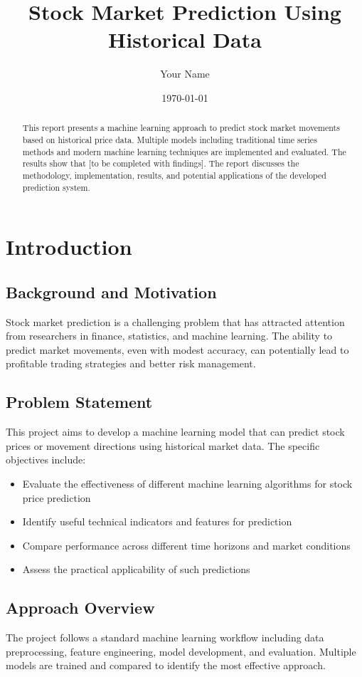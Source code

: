\documentclass[12pt,a4paper]{article}
\title{Stock Market Prediction Using Historical Data}
\author{Your Name}
\date{\today}
\begin{document}
\maketitle

\begin{abstract}
This report presents a machine learning approach to predict stock market movements based on historical price data. Multiple models including traditional time series methods and modern machine learning techniques are implemented and evaluated. The results show that [to be completed with findings]. The report discusses the methodology, implementation, results, and potential applications of the developed prediction system.
\end{abstract}

\tableofcontents
\newpage

\section{Introduction}
\subsection{Background and Motivation}
Stock market prediction is a challenging problem that has attracted attention from researchers in finance, statistics, and machine learning. The ability to predict market movements, even with modest accuracy, can potentially lead to profitable trading strategies and better risk management.

\subsection{Problem Statement}
This project aims to develop a machine learning model that can predict stock prices or movement directions using historical market data. The specific objectives include:
\begin{itemize}
    \item Evaluate the effectiveness of different machine learning algorithms for stock price prediction
    \item Identify useful technical indicators and features for prediction
    \item Compare performance across different time horizons and market conditions
    \item Assess the practical applicability of such predictions
\end{itemize}

\subsection{Approach Overview}
The project follows a standard machine learning workflow including data preprocessing, feature engineering, model development, and evaluation. Multiple models are trained and compared to identify the most effective approach.
\end{document}
